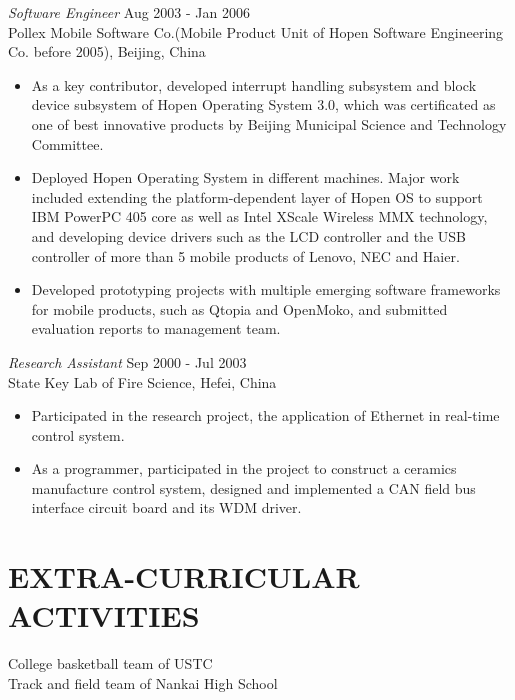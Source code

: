 \documentclass[line,margin]{res}
\begin{document}
\begin{resume}
                {\sl Software Engineer} \hfill                  Aug 2003 - Jan 2006 \\
                Pollex Mobile Software Co.(Mobile Product
                Unit of Hopen Software Engineering Co. before 2005), Beijing, China
                 \begin{itemize}  \itemsep -2pt %
                 \item As a key contributor, developed interrupt handling subsystem and block device
                   subsystem of Hopen Operating System 3.0, which was certificated as one of best
                   innovative products by Beijing Municipal Science and Technology Committee.
                 \item Deployed Hopen Operating System in different machines. Major work included
                   extending the platform-dependent layer of Hopen OS to support IBM PowerPC 405
                   core as well as Intel XScale Wireless MMX technology, and developing device
                   drivers such as the LCD controller and the USB controller of more than 5 mobile
                   products of Lenovo, NEC and Haier.
                 \item Developed prototyping projects with multiple emerging software frameworks
                   for mobile products, such as Qtopia and OpenMoko, and submitted evaluation 
                   reports to management team.
                 \end{itemize}
                {\sl Research Assistant} \hfill                 Sep 2000 - Jul 2003 \\
                State Key Lab of Fire Science, Hefei, China
                  \begin{itemize}
                  \item Participated in the research project, the application of Ethernet in real-time
                    control system. 
                   \item As a programmer, participated in the project to construct a ceramics
                     manufacture control system, designed and implemented a CAN field bus interface
                     circuit board and its WDM driver.
                   \end{itemize} 
 
\section{EXTRA-CURRICULAR \\ ACTIVITIES}             
                College basketball team of USTC\\
                Track and field team of Nankai High School

\end{resume}
\end{document}
